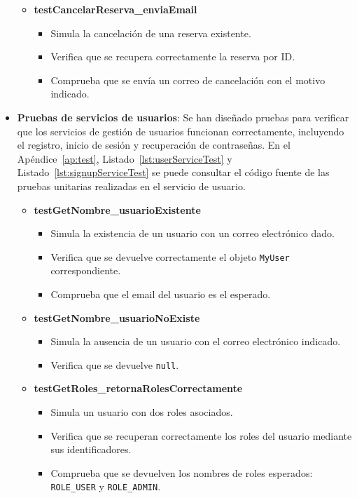 \begin{itemize}
\begin{itemize}
      \item \textbf{testCancelarReserva\_enviaEmail}
        \begin{itemize}
          \item Simula la cancelación de una reserva existente.
          \item Verifica que se recupera correctamente la reserva por ID.
          \item Comprueba que se envía un correo de cancelación con el motivo indicado.
        \end{itemize}
    \end{itemize}
    \item \textbf{Pruebas de servicios de usuarios}: Se han diseñado pruebas para verificar que los servicios de gestión de usuarios funcionan correctamente, incluyendo el registro, inicio de sesión y recuperación de contraseñas. En el Apéndice~\ref{ap:test}, Listado~\ref{lst:userServiceTest} y Listado~\ref{lst:signupServiceTest} se puede consultar el código fuente de las pruebas unitarias realizadas en el servicio de usuario.
       \begin{itemize}
        \item \textbf{testGetNombre\_usuarioExistente}
          \begin{itemize}
            \item Simula la existencia de un usuario con un correo electrónico dado.
            \item Verifica que se devuelve correctamente el objeto \texttt{MyUser} correspondiente.
            \item Comprueba que el email del usuario es el esperado.
          \end{itemize}

        \item \textbf{testGetNombre\_usuarioNoExiste}
          \begin{itemize}
            \item Simula la ausencia de un usuario con el correo electrónico indicado.
            \item Verifica que se devuelve \texttt{null}.
          \end{itemize}

        \item \textbf{testGetRoles\_retornaRolesCorrectamente}
          \begin{itemize}
            \item Simula un usuario con dos roles asociados.
            \item Verifica que se recuperan correctamente los roles del usuario mediante sus identificadores.
            \item Comprueba que se devuelven los nombres de roles esperados: \texttt{ROLE\_USER} y \texttt{ROLE\_ADMIN}.
          \end{itemize}


\end{itemize}
\end{itemize}
